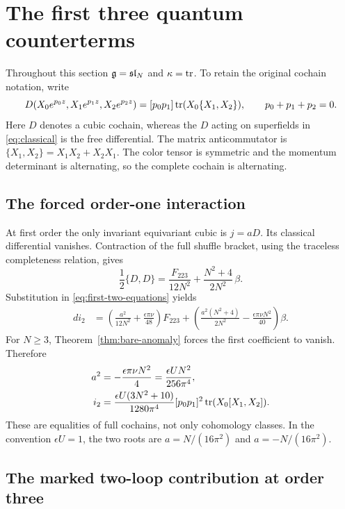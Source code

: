 \section{The first three quantum counterterms}
\label{sec:first-counterterms}

Throughout this section $\mathfrak g=\mathfrak{sl}_N$ and $\kappa=\operatorname{tr}$.
To retain the original cochain notation, write
\[
 D(X_0e^{p_0z},X_1e^{p_1z},X_2e^{p_2z})
   =[p_0p_1]\operatorname{tr}(X_0\{X_1,X_2\}),\qquad
 p_0+p_1+p_2=0.
\]
Here $D$ denotes a cubic cochain, whereas the $D$ acting on
superfields in \eqref{eq:classical} is the free differential.
The matrix anticommutator is
$\{X_1,X_2\}=X_1X_2+X_2X_1$.
The color tensor is symmetric and the momentum determinant is
alternating, so the complete cochain is alternating.

\subsection{The forced order-one interaction}

At first order the only invariant equivariant cubic is $j=aD$.
Its classical differential vanishes. Contraction of the full
shuffle bracket, using the traceless completeness relation, gives
\begin{equation}
 \frac12\{D,D\}
  =\frac{F_{223}}{12N^2}
     +\frac{N^2+4}{2N^2}\,\beta .
 \label{eq:DD}
\end{equation}
Substitution in \eqref{eq:first-two-equations} yields
\begin{align}
 d i_2
 &=\left(\frac{a^2}{12N^2}
                       +\frac{\epsilon\pi\nu}{48}\right)F_{223}
   +\left(\frac{a^2(N^2+4)}{2N^2}
                       -\frac{\epsilon\pi\nu N^2}{40}\right)\beta .
 \label{eq:order-two-assembly}
\end{align}
For $N\ge3$, Theorem~\ref{thm:bare-anomaly} forces the first
coefficient to vanish. Therefore
\begin{align}
 a^2&=-\frac{\epsilon\pi\nu N^2}{4}
       =\frac{\epsilon U N^2}{256\pi^4},\notag\\
 i_2&=\frac{\epsilon U(3N^2+10)}{1280\pi^4}
         [p_0p_1]^2\operatorname{tr}(X_0[X_1,X_2]).
 \label{eq:first-two-counterterms}
\end{align}
These are equalities of full cochains, not only cohomology classes.
In the convention $\epsilon U=1$, the two roots are
$a=N/(16\pi^2)$ and $a=-N/(16\pi^2)$.

\subsection{The marked two-loop contribution at order three}

